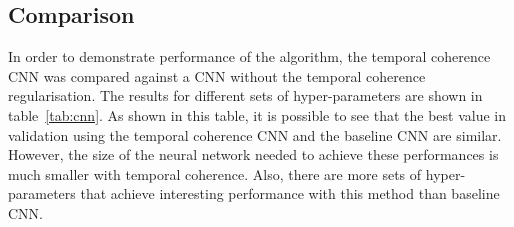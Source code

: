\subsection{Comparison}

In order to demonstrate performance of the algorithm, the temporal coherence CNN was compared against a CNN without the temporal coherence regularisation. The results for different sets of hyper-parameters are shown in table~\ref{tab:cnn}. As shown in this table, it is possible to see that the best value in validation using the temporal coherence CNN and the baseline CNN are similar. However, the size of the neural network needed to achieve these performances is much smaller with temporal coherence. Also, there are more sets of hyper-parameters that achieve interesting performance with this method than baseline CNN.

